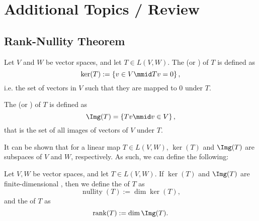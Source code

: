 \documentclass[notoc,notitlepage]{tufte-book}
\DeclareMathOperator{\nullity}{nullity}
\DeclareMathOperator{\rank}{rank}
\begin{document}


\appendix

\chapter{Additional Topics / Review}%
\label{chp:additional_topics_review}

\section{Rank-Nullity Theorem}%
\label{sec:rank_nullity_theorem}

\nocite{stephen2002}

\begin{defn}\label{defn:kernel_and_image}
  Let $V$ and $W$ be vector spaces, and let $T \in L(V, W)$.
  The  (or ) of $T$ is defined as
  \begin{equation*}
    \ker(T) := \left\{ v \in V \mmid Tv = 0 \right\},
  \end{equation*}
  i.e. the set of vectors in $V$ such that they are mapped to $0$ under $T$.

  The  (or ) of $T$ is defined as
  \begin{equation*}
    \Img(T) = \left\{ Tv \mmid v \in V \right\},
  \end{equation*}
  that is the set of all images of vectors of $V$ under $T$.
\end{defn}

It can be shown that for a linear map $T \in L(V, W)$,
$\ker (T)$ and $\Img(T)$ are subspaces of $V$ and $W$, respectively.
As such, we can define the following:

\begin{defn}\label{defn:rank_and_nullity}
  Let $V, W$ be vector spaces, and let $T \in L(V, W)$.
  If $\ker(T)$ and $\Img(T)$ are finite-dimensional
  ,
  then we define the  of $T$ as
  \begin{equation*}
    \nullity(T) := \dim \ker (T),
  \end{equation*}
  and the  of $T$ as
  \begin{equation*}
    \rank(T) := \dim \Img(T).
  \end{equation*}
\end{defn}
\end{document}
